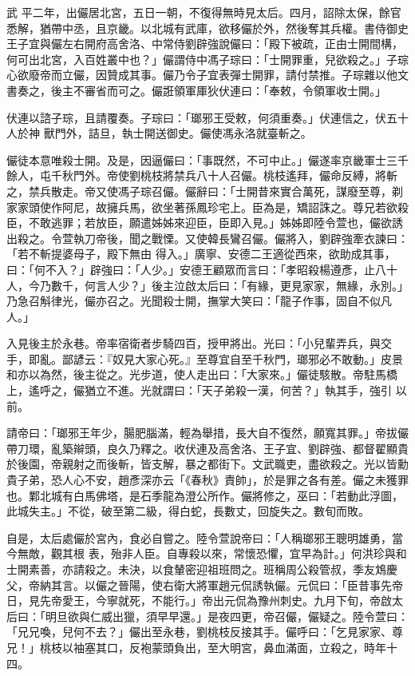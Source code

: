 \begin{pinyinscope}
 武
 平二年，出儼居北宮，五日一朝，不復得無時見太后。四月，詔除太保，餘官悉解，猶帶中丞，且京畿。以北城有武庫，欲移儼於外，然後奪其兵權。書侍御史王子宜與儼左右開府高舍洛、中常侍劉辟強說儼曰：「殿下被疏，正由士開間構，何可出北宮，入百姓叢中也？」儼謂侍中馮子琮曰：「士開罪重，兒欲殺之。」子琮心欲廢帝而立儼，因贊成其事。儼乃令子宜表彈士開罪，請付禁推。子琮雜以他文書奏之，後主不審省而可之。儼誑領軍厙狄伏連曰：「奉敕，令領軍收士開。」



 伏連以諮子琮，且請覆奏。子琮曰：「瑯邪王受敕，何須重奏。」伏連信之，伏五十人於神
 獸門外，詰旦，執士開送御史。儼使馮永洛就臺斬之。



 儼徒本意唯殺士開。及是，因逼儼曰：「事既然，不可中止。」儼遂率京畿軍士三千餘人，屯千秋門外。帝使劉桃枝將禁兵八十人召儼。桃枝遙拜，儼命反縛，將斬之，禁兵散走。帝又使馮子琮召儼。儼辭曰：「士開昔來實合萬死，謀廢至尊，剃家家頭使作阿尼，故擁兵馬，欲坐著孫鳳珍宅上。臣為是，矯詔誅之。尊兄若欲殺臣，不敢逃罪；若放臣，願遣姊姊來迎臣，臣即入見。」姊姊即陸令萱也，儼欲誘出殺之。令萱執刀帝後，聞之戰慄。又使韓長鸞召儼。儼將入，劉辟強牽衣諫曰：「若不斬提婆母子，殿下無由
 得入。」廣寧、安德二王適從西來，欲助成其事，曰：「何不入？」辟強曰：「人少。」安德王顧眾而言曰：「孝昭殺楊遵彥，止八十人，今乃數千，何言人少？」後主泣啟太后曰：「有緣，更見家家，無緣，永別。」乃急召斛律光，儼亦召之。光聞殺士開，撫掌大笑曰：「龍子作事，固自不似凡人。」



 入見後主於永巷。帝率宿衛者步騎四百，授甲將出。光曰：「小兒輩弄兵，與交手，即亂。鄙諺云：『奴見大家心死。』至尊宜自至千秋門，瑯邪必不敢動。」皮景和亦以為然，後主從之。光步道，使人走出曰：「大家來。」儼徒駭散。帝駐馬橋上，遙呼之，儼猶立不進。光就謂曰：「天子弟殺一漢，何苦？」執其手，強引
 以前。



 請帝曰：「瑯邪王年少，腸肥腦滿，輕為舉措，長大自不復然，願寬其罪。」帝拔儼帶刀環，亂築辮頭，良久乃釋之。收伏連及高舍洛、王子宜、劉辟強、都督翟顯貴於後園，帝親射之而後斬，皆支解，暴之都街下。文武職吏，盡欲殺之。光以皆勳貴子弟，恐人心不安，趙彥深亦云「《春秋》責帥」，於是罪之各有差。儼之未獲罪也。鄴北城有白馬佛塔，是石季龍為澄公所作。儼將修之，巫曰：「若動此浮圖，此城失主。」不從，破至第二級，得白蛇，長數丈，回旋失之。數旬而敗。



 自是，太后處儼於宮內，食必自嘗之。陸令萱說帝曰：「人稱瑯邪王聰明雄勇，當今無敵，觀其根
 表，殆非人臣。自專殺以來，常懷恐懼，宜早為計。」何洪珍與和士開素善，亦請殺之。未決，以食輦密迎祖班問之。班稱周公殺管叔，季友鴆慶父，帝納其言。以儼之晉陽，使右衛大將軍趙元侃誘執儼。元侃曰：「臣昔事先帝日，見先帝愛王，今寧就死，不能行。」帝出元侃為豫州刺史。九月下旬，帝啟太后曰：「明旦欲與仁威出獵，須早早還。」是夜四更，帝召儼，儼疑之。陸令萱曰：「兄兄喚，兒何不去？」儼出至永巷，劉桃枝反接其手。儼呼曰：「乞見家家、尊兄！」桃枝以袖塞其口，反袍蒙頭負出，至大明宮，鼻血滿面，立殺之，時年十四。




\end{pinyinscope}
